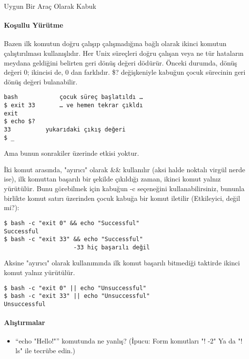 \begin{section}{Uygun Bir Araç Olarak Kabuk}
\paragraph{Koşullu Yürütme}{Bazen ilk komutun doğru çalışıp çalışmadığına bağlı olarak ikinci komutun çalıştırılması kullanışlıdır. Her Unix süreçleri doğru çalışan veya ne tür hataların meydana geldiğini belirten geri dönüş değeri dödürür. Önceki durumda, dönüş değeri 0; ikincisi de, 0 dan farklıdır. \$? değişkeniyle kabuğun çocuk sürecinin geri dönüş değeri bulanabilir.
\begin{verbatim}
bash 			çocuk süreç başlatıldı …
$ exit 33 		… ve hemen tekrar çıkldı
exit
$ echo $?
33 			yukarıdaki çıkış değeri
$ _
\end{verbatim}

Ama bunun sonrakiler üzerinde etkisi yoktur.

İki komut arasında, "ayırıcı" olarak \&\& kullanılır (aksi halde noktalı virgül nerde ise), ilk komuttan başarılı bir şekilde çıkıldığı zaman, ikinci komut yalnız yürütülür. Bunu görebilmek için kabuğun -c seçeneğini kullanabilirsiniz, bununla birlikte komut satırı üzerinden çocuk kabuğa bir komut iletilir (Etkileyici, değil mi?):
\begin{verbatim}
$ bash -c "exit 0" && echo "Successful"
Successful
$ bash -c "exit 33" && echo "Successful"
 					-33 hiç başarılı değil
\end{verbatim}

Aksine "ayırıcı" olarak \textbar \textbar kullanımında ilk komut başarılı bitmediği taktirde ikinci komut yalnız yürütülür. 
\begin{verbatim}
$ bash -c "exit 0" || echo "Unsuccessful"
$ bash -c "exit 33" || echo "Unsuccessful"
Unsuccessful
\end{verbatim} }
\paragraph{Alıştırmalar}{
\begin{itemize}
\item “echo "Hello!"” komutunda ne yanlış? (İpucu: Form komutları "! -2" Ya da "! ls" ile tecrübe edin.)
\end{itemize}
}
\end{section}
